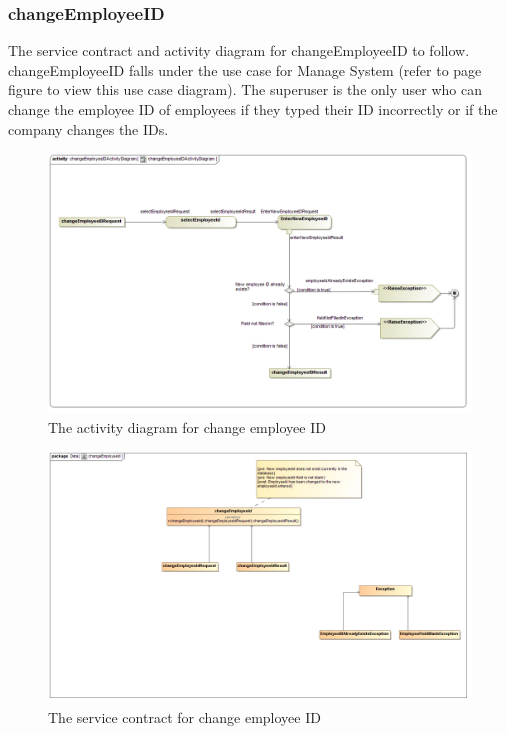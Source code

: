 \documentclass[a4paper,12pt]{report}
\begin{document}
\subsubsection{changeEmployeeID}
The service contract and activity diagram for changeEmployeeID to follow. changeEmployeeID falls under the use case for Manage System (refer to page   figure   to view this use case diagram). The superuser is the only user who can change the employee ID of employees if they typed their ID incorrectly or if the company changes the IDs.
\begin{figure}[H]
  \centering
    \includegraphics[width=1.0\textwidth]{../images/changeEmployeeIDActivityDiagram.png}
    \caption{The activity diagram for change employee ID} 
\end{figure}

\begin{figure}[H]
	\centering
	\includegraphics[width=1.0\textwidth]{../images/changeEmployeeIdSC.png}
	\caption{The service contract for change employee ID}
\end{figure}
\end{document}
